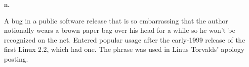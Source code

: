  n.

A bug in a public software release that is so
embarrassing that the
author notionally wears a brown paper bag over his head for a while so he won't
be recognized on the net. Entered popular usage after the early-1999 release of
the first Linux 2.2, which had one. The phrase was used in Linus
Torvalds' apology posting.

